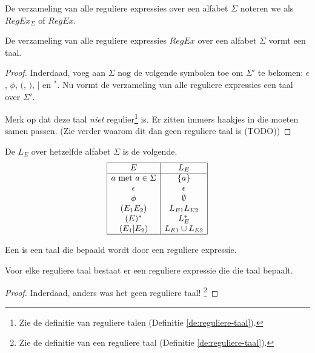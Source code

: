 \documentclass[main.tex]{subfiles}
\begin{document}
\begin{de}
  De verzameling van alle reguliere expressies over een alfabet $\Sigma$ noteren we als $RegEx_{\Sigma}$ of $RegEx$.
\end{de}

\begin{st}
  De verzameling van alle reguliere expressies $RegEx$ over een alfabet $\Sigma$ vormt een taal.

  \begin{proof}
    Inderdaad, voeg aan $\Sigma$ nog de volgende symbolen toe om $\Sigma'$ te bekomen: $\epsilon$, $\phi$, $($, $)$, $|$ en $^{*}$.
    Nu vormt de verzameling van alle reguliere expressies een taal over $\Sigma'$.

    Merk op dat deze taal \emph{niet} regulier\footnote{Zie de definitie van reguliere talen (Definitie \ref{de:reguliere-taal}).} is. Er zitten immers haakjes in die moeten samen passen. (Zie verder waarom dit dan geen reguliere taal is (TODO)) 
  \end{proof}
\end{st}

\begin{de}
  \label{def:taal-bepaald-door-regex}
  De  $L_E$ over hetzelfde alfabet $\Sigma$ is de volgende.
  \[
  \begin{array}{|c|c|}
    \hline
    E                           & L_E\\
    \hline
    a \text{ met } a \in \Sigma & \{a\}\\
    \epsilon                    & {\epsilon}\\
    \phi                        & \emptyset\\
    (E_1E_2)                    & L_{E1}L_{E2}\\
    (E)^{*}                      & L_E^*\\
    (E_1|E_2)                   & L_{E1} \cup L_{E2}\\
    \hline
  \end{array}
  \]
\end{de}

\begin{de}
  \label{de:reguliere-taal}
  Een  is een taal die bepaald wordt door een reguliere expressie.
\end{de}

\begin{ei}
  \label{ei:reguliere-taal-expressie}
  Voor elke reguliere taal bestaat er een reguliere expressie die die taal bepaalt.

  \begin{proof}
    Inderdaad, anders was het geen reguliere taal! \footnote{Zie de definitie van een reguliere taal (Definitie \ref{de:reguliere-taal}).}
  \end{proof}
\end{ei}
\end{document}
